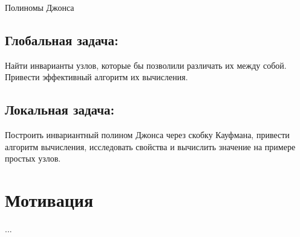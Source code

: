 \documentclass[a4paper,8pt]{extarticle}
\begin{document}
\begin{center}
    \Huge Полиномы Джонса
\end{center}
\begin{multicols}{2}
\subsection*{Глобальная задача:}
Найти инварианты узлов, которые бы позволили различать их между собой. Привести эффективный алгоритм их вычисления.

\columnbreak
\subsection*{Локальная задача:}
Построить инвариантный полином Джонса через скобку Кауфмана, привести алгоритм вычисления, исследовать свойства и вычислить значение на примере простых узлов.
\end{multicols}

\section*{Мотивация}
...
\end{document}
